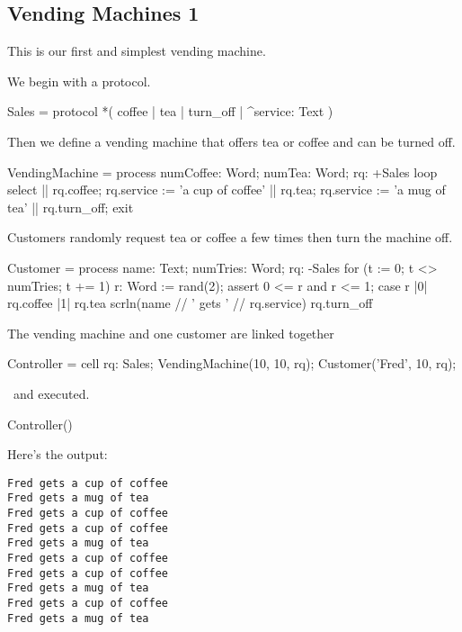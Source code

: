\subsection{Vending Machines 1}\label{sec-vm-1}

This is our first and simplest vending machine.

We begin with a protocol.
\begin{code}
Sales = protocol { *( coffee | tea | turn_off | ^service: Text ) }    
\end{code}

Then we define a vending machine that offers tea or coffee and can be turned off.
\begin{code}
VendingMachine = process numCoffee: Word; numTea: Word; rq: +Sales
{
    loop select
    {
        || rq.coffee; rq.service := 'a cup of coffee'
        || rq.tea; rq.service := 'a mug of tea'
        || rq.turn_off; exit
    }
}
\end{code}

Customers randomly request tea or coffee a few times then turn the machine off.
\begin{code}
Customer = process name: Text; numTries: Word; rq: -Sales
{
    for (t := 0; t <> numTries; t += 1)
    {
        r: Word := rand(2);
        assert 0 <= r and r <= 1;
        case r
        {
            |0| rq.coffee
            |1| rq.tea
        }
        scrln(name // ' gets ' // rq.service)
    }
    rq.turn_off
}
\end{code}

The vending machine and one customer are linked together\textellipsis
\begin{code}
Controller = cell
{
    rq: Sales;
    VendingMachine(10, 10, rq);
    Customer('Fred', 10, rq);
}
\end{code}
\textellipsis\ and executed.
\begin{code}
Controller()
\end{code}

Here's the output:
\begin{verbatim}
Fred gets a cup of coffee
Fred gets a mug of tea
Fred gets a cup of coffee
Fred gets a cup of coffee
Fred gets a mug of tea
Fred gets a cup of coffee
Fred gets a cup of coffee
Fred gets a mug of tea
Fred gets a cup of coffee
Fred gets a mug of tea
\end{verbatim}